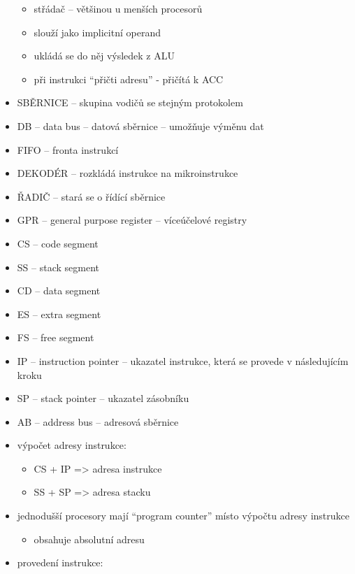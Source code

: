 \documentclass[a4paper,12pt]{article}
\providecommand{\tightlist}{%
\setlength{\itemsep}{0pt}\setlength{\parskip}{0pt}}
\begin{document}
\begin{itemize}
  \begin{itemize}
  \tightlist
  \item střádač -- většinou u menších procesorů
  \item slouží jako implicitní operand
  \item ukládá se do něj výsledek z ALU
  \item při instrukci ``přičti adresu'' - přičítá k ACC
  \end{itemize}
\item SBĚRNICE -- skupina vodičů se stejným protokolem
\item DB -- data bus -- datová sběrnice -- umožňuje výměnu dat
\item FIFO -- fronta instrukcí
\item DEKODÉR -- rozkládá instrukce na mikroinstrukce
\item ŘADIČ -- stará se o řídící sběrnice
\item GPR -- general purpose register -- víceúčelové registry
\item CS -- code segment
\item SS -- stack segment
\item CD -- data segment
\item ES -- extra segment
\item FS -- free segment
\item IP -- instruction pointer -- ukazatel instrukce, která se provede v
  následujícím kroku
\item SP -- stack pointer -- ukazatel zásobníku
\item AB -- address bus -- adresová sběrnice
\item výpočet adresy instrukce:

  \begin{itemize}
  \tightlist
  \item CS + IP =\textgreater{} adresa instrukce
  \item SS + SP =\textgreater{} adresa stacku
  \end{itemize}
\item jednodušší procesory mají ``program counter'' místo výpočtu adresy
  instrukce

  \begin{itemize}
  \tightlist
  \item obsahuje absolutní adresu
  \end{itemize}
\item provedení instrukce:


\end{itemize}
\end{document}
